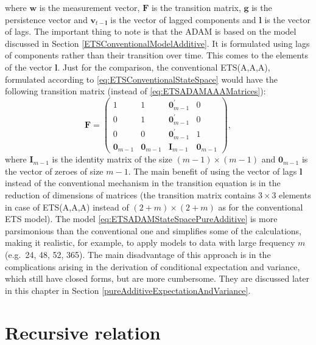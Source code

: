 \documentclass[
]{book}
\theoremstyle{definition}
\theoremstyle{definition}
\theoremstyle{definition}
\theoremstyle{definition}
\theoremstyle{remark}
\begin{document}
where \(\mathbf{w}\) is the measurement vector, \(\mathbf{F}\) is the transition matrix, \(\mathbf{g}\) is the persistence vector and \(\mathbf{v}_{t-\mathbf{l}}\) is the vector of lagged components and \(\mathbf{l}\) is the vector of lags. The important thing to note is that the ADAM is based on the model discussed in Section \ref{ETSConventionalModelAdditive}. It is formulated using lags of components rather than their transition over time. This comes to the elements of the vector \(\mathbf{l}\). Just for the comparison, the conventional ETS(A,A,A), formulated according to \eqref{eq:ETSConventionalStateSpace} would have the following transition matrix (instead of \eqref{eq:ETSADAMAAAMatrices}):
\begin{equation}
  \mathbf{F} = \begin{pmatrix} 1 & 1 & \mathbf{0}^\prime_{m-1} & 0 \\ 0 & 1 & \mathbf{0}^\prime_{m-1} & 0 \\ 0 & 0 & \mathbf{0}^\prime_{m-1} & 1 \\ \mathbf{0}_{m-1} & \mathbf{0}_{m-1} & \mathbf{I}_{m-1} & \mathbf{0}_{m-1} \end{pmatrix},
  \label{eq:ETSADAMAAAMatricesTransition}
\end{equation}
where \(\mathbf{I}_{m-1}\) is the identity matrix of the size \((m-1) \times (m-1)\) and \(\mathbf{0}_{m-1}\) is the vector of zeroes of size \(m-1\). The main benefit of using the vector of lags \(\mathbf{l}\) instead of the conventional mechanism in the transition equation is in the reduction of dimensions of matrices (the transition matrix contains \(3\times 3\) elements in case of ETS(A,A,A) instead of \((2+m)\times (2+m)\) as for the conventional ETS model). The model \eqref{eq:ETSADAMStateSpacePureAdditive} is more parsimonious than the conventional one and simplifies some of the calculations, making it realistic, for example, to apply models to data with large frequency \(m\) (e.g.~24, 48, 52, 365). The main disadvantage of this approach is in the complications arising in the derivation of conditional expectation and variance, which still have closed forms, but are more cumbersome. They are discussed later in this chapter in Section \ref{pureAdditiveExpectationAndVariance}.

\hypertarget{adamETSPureAdditiveRecursive}{%
\section{Recursive relation}\label{adamETSPureAdditiveRecursive}}
\end{document}
